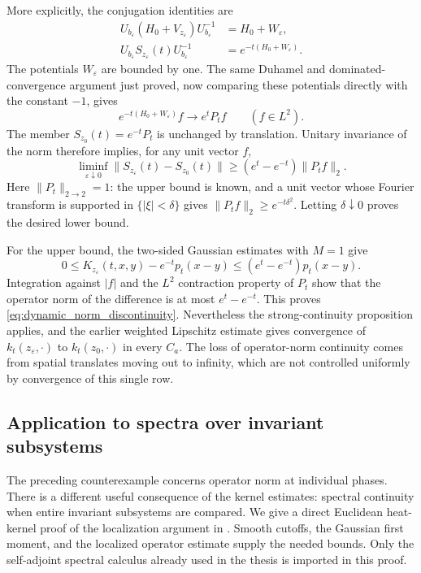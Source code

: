More explicitly, the conjugation identities are
\[
\begin{aligned}
U_{b_\varepsilon}(H_0+V_{z_\varepsilon})U_{b_\varepsilon}^{-1}
 &=H_0+W_\varepsilon,\\
U_{b_\varepsilon}S_{z_\varepsilon}(t)U_{b_\varepsilon}^{-1}
 &=e^{-t(H_0+W_\varepsilon)}.
\end{aligned}
\]
The potentials $W_\varepsilon$ are bounded by one. The same Duhamel
and dominated-convergence argument just proved, now comparing these
potentials directly with the constant $-1$, gives
\[
e^{-t(H_0+W_\varepsilon)}f\longrightarrow e^tP_tf
\qquad(f\in L^2).
\]
The member $S_{z_0}(t)=e^{-t}P_t$ is unchanged by translation.
Unitary invariance of the norm therefore implies, for any unit vector $f$,
\[
\liminf_{\varepsilon\downarrow0}
\|S_{z_\varepsilon}(t)-S_{z_0}(t)\|
\geq(e^t-e^{-t})\|P_tf\|_2.
\]
Here $\|P_t\|_{2\to2}=1$: the upper bound is known, and a unit vector
whose Fourier transform is supported in $\{|\xi|<\delta\}$ gives
$\|P_tf\|_2\geq e^{-t\delta^2}$. Letting $\delta\downarrow0$
proves the desired lower bound.

For the upper bound, the two-sided Gaussian estimates with $M=1$ give
\[
0\leq K_{z_\varepsilon}(t,x,y)-e^{-t}p_t(x-y)
\leq(e^t-e^{-t})p_t(x-y).
\]
Integration against $|f|$ and the $L^2$ contraction property of $P_t$
show that the operator norm of the difference is at most $e^t-e^{-t}$.
This proves \eqref{eq:dynamic_norm_discontinuity}. Nevertheless the
strong-continuity proposition applies, and the earlier weighted
Lipschitz estimate gives convergence of $k_t(z_\varepsilon,\cdot)$
to $k_t(z_0,\cdot)$ in every $C_a$. The loss of operator-norm
continuity comes from spatial translates moving out to infinity,
which are not controlled uniformly by convergence of this single row.

\subsection{Application to spectra over invariant subsystems}
The preceding counterexample concerns operator norm at individual phases.
There is a different useful consequence of the kernel estimates: spectral
continuity when entire invariant subsystems are compared. We give a direct
Euclidean heat-kernel proof of the localization argument in
\textcite[Lemmas~4.2--4.3 and Theorem~4.6]{BeckusTakase2025Spectral}.
Smooth cutoffs, the Gaussian first moment, and the localized operator
estimate supply the needed bounds. Only the self-adjoint spectral
calculus already used in the thesis is imported in this proof.

